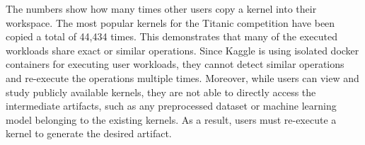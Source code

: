 The numbers show how many times other users copy a kernel into their workspace.
The most popular kernels for the Titanic competition have been copied a total of 44,434 times.
This demonstrates that many of the executed workloads share exact or similar operations.
Since Kaggle is using isolated docker containers for executing user workloads, they cannot detect similar operations and re-execute the operations multiple times.
Moreover, while users can view and study publicly available kernels, they are not able to directly access the intermediate artifacts, such as any preprocessed dataset or machine learning model belonging to the existing kernels.
As a result, users must re-execute a kernel to generate the desired artifact.


% 
